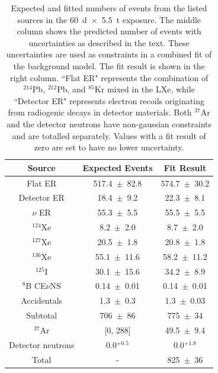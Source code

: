 \documentclass[reprint, showpacs,
preprintnumbers,
amsmath,amssymb,
aps, floatfix,
superscriptaddress,
prd, nofootinbib]{revtex4-1}
\begin{document}
\begin{table}[ht]
    \centering
    \caption{Expected and fitted numbers of events from the listed sources in the 60~d~$\times$~5.5~t exposure.
    The middle column shows the predicted number of events with uncertainties as described in the text.
    These uncertainties are used as constraints in a combined fit of the background model.
    The fit result is shown in the right column. ``Flat ER" represents the combination of ${}^{214}$Pb, ${}^{212}$Pb, and ${}^{85}$Kr mixed in the LXe, while ``Detector ER" represents electron recoils originating from radiogenic decays in detector materials.
    Both ${}^{37}$Ar and the detector neutrons have non-gaussian constraints and are totalled separately.
    Values with a fit result of zero are set to have no lower uncertainty.
    }
    \begin{ruledtabular}
    \begin{tabular}{ccc}
        Source                   & Expected Events      & Fit Result        \\ \hline
        Flat ER                  & 517.4~$\pm$~82.8     & 574.7~$\pm$~30.2  \\
        Detector ER              & 18.4~$\pm$~9.2       & 22.3~$\pm$~8.1    \\
        $\nu$ ER                 & 55.3~$\pm$~5.5       & 55.5~$\pm$~5.5    \\
        ${}^{124}$Xe             & 8.2~$\pm$~2.0        & 8.7~$\pm$~2.0     \\
        ${}^{127}$Xe             & 20.5~$\pm$~1.8       & 20.8~$\pm$~1.8    \\
        ${}^{136}$Xe             & 55.1~$\pm$~11.6      & 58.2~$\pm$~11.2   \\
        ${}^{125}$I              & 30.1~$\pm$~15.6      & 34.2~$\pm$~8.9    \\
        ${}^{8}$B CE$\nu$NS      & 0.14~$\pm$~0.01      & 0.14~$\pm$~0.01   \\
        Accidentals              & 1.3~$\pm$~0.3        & 1.3~$\pm$~0.03    \\ \hline
        Subtotal                 & 706~$\pm$~86         & 775~$\pm$~34 \\ \hline
        ${}^{37}$Ar              & [0, 288]             & 49.5~$\pm$~9.4    \\
        Detector neutrons        & 0.0$^{+0.5}$         & 0.0$^{+1.8}$      \\ \hline
        Total                    & -                    & 825~$\pm$~36  
    \end{tabular}
    \end{ruledtabular}
    \label{tab:fit_result} 
\end{table}
\end{document}
